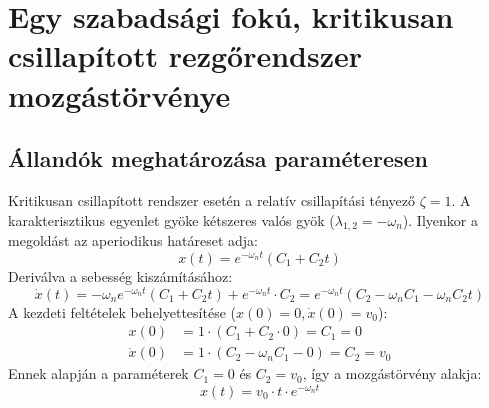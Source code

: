 \newpage
\section{Egy szabadsági fokú, kritikusan csillapított rezgőrendszer mozgástörvénye}

\subsection*{Állandók meghatározása paraméteresen}
Kritikusan csillapított rendszer esetén a relatív csillapítási tényező $\zeta = 1$. A karakterisztikus egyenlet gyöke kétszeres valós gyök ($\lambda_{1,2} = -\omega_n$). Ilyenkor a megoldást az aperiodikus határeset adja:
\begin{equation}
    x(t) = e^{-\omega_n t} \left( C_1 + C_2 t \right)
\end{equation}
Deriválva a sebesség kiszámításához:
\begin{equation}
    \dot{x}(t) = -\omega_n e^{-\omega_n t} \left( C_1 + C_2 t \right) + e^{-\omega_n t} \cdot C_2 = e^{-\omega_n t} \left( C_2 - \omega_n C_1 - \omega_n C_2 t \right)
\end{equation}
A kezdeti feltételek behelyettesítése ($x(0) = 0, \dot{x}(0) = v_0$):
\begin{align}
    x(0) &= 1 \cdot \left( C_1 + C_2 \cdot 0 \right) = C_1 = 0 \\
    \dot{x}(0) &= 1 \cdot \left( C_2 - \omega_n C_1 - 0 \right) = C_2 = v_0 
\end{align}
Ennek alapján a paraméterek $C_1 = 0$ és $C_2 = v_0$, így a mozgástörvény alakja:
\begin{equation}
    x(t) = v_0 \cdot t \cdot e^{-\omega_n t}
\end{equation}

